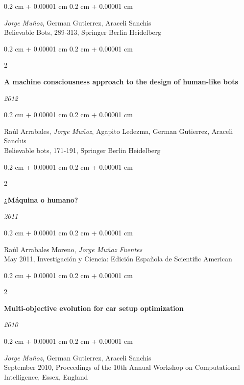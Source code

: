 \documentclass[10pt, letterpaper]{article}
\newenvironment{onecolentry}{
	\begin{adjustwidth}{
		0.2 cm + 0.00001 cm
	}{
		0.2 cm + 0.00001 cm
	}
	}{
	\end{adjustwidth}
} %
\newenvironment{twocolentry}[2][]{
	\onecolentry
	\def\secondColumn{#2}
	\setcolumnwidth{\fill, 5.5 cm}
	\begin{paracol}{2}
	}{
		\switchcolumn \raggedleft \secondColumn
	\end{paracol}
	\endonecolentry
} %
\let\hrefWithoutArrow\href
\renewcommand{\href}[2]{\hrefWithoutArrow{#1}{\ifthenelse{\equal{#2}{}}{ }{#2 }\raisebox{.15ex}{\footnotesize \faExternalLink*}}}
\begin{document}
	\vspace{0.10 cm}
	\begin{onecolentry}
		\textit{Jorge Muñoz}, German Gutierrez, Araceli Sanchis\\
		Believable Bots, 289-313, Springer Berlin Heidelberg\\
		\href{https://link.springer.com/chapter/10.1007\%2F978-3-642-32323-2_12}{[PDF]}
	\end{onecolentry}

	\vspace{0.10 cm}

	\begin{twocolentry}{
		\textit{2012}}
		\textbf{A machine consciousness approach to the design of human-like bots}
	\end{twocolentry}

	\vspace{0.10 cm}
	\begin{onecolentry}
		Raúl Arrabales, \textit{Jorge Muñoz}, Agapito Ledezma, German Gutierrez, Araceli Sanchis\\
		Believable bots, 171-191, Springer Berlin Heidelberg\\
		\href{https://link.springer.com/chapter/10.1007/978-3-642-32323-2_7/fulltext.html}{[PDF]}
	\end{onecolentry}

	\vspace{0.2 cm}

	\begin{twocolentry}{
		\textit{2011}}
		\textbf{¿Máquina o humano?}
	\end{twocolentry}

	\vspace{0.10 cm}
	\begin{onecolentry}
		Raúl Arrabales Moreno, \textit{Jorge Muñoz Fuentes}\\
		May 2011, Investigación y Ciencia: Edición Española de Scientific American
	\end{onecolentry}

	\vspace{0.2 cm}

	\begin{twocolentry}{
		\textit{2010}}
		\textbf{Multi-objective evolution for car setup optimization}
	\end{twocolentry}

	\vspace{0.10 cm}
	\begin{onecolentry}
		\textit{Jorge Muñoz}, German Gutierrez, Araceli Sanchis\\
		September 2010, Proceedings of the 10th Annual Workshop on Computational Intelligence, Essex, England\\
		\href{https://s3.amazonaws.com/academia.edu.documents/40052996/Multi-objective_evolution_for_Car_Setup_20151116-17636-ssmos6.pdf}{[PDF]}
	\end{onecolentry}
\end{document}
